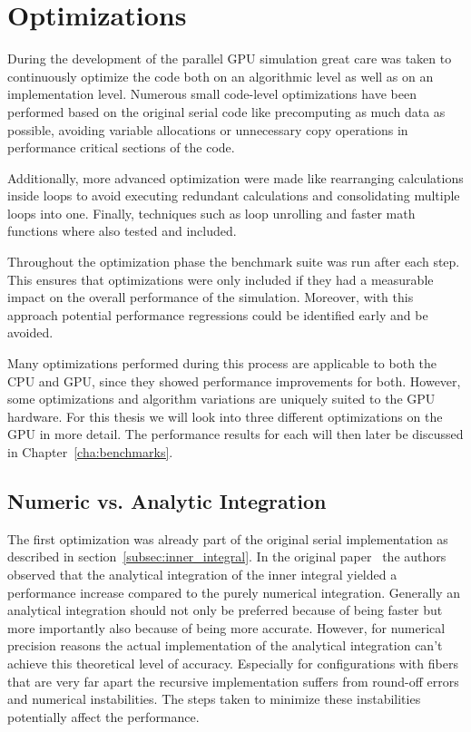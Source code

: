 \section{Optimizations}
\label{sec:parallel_optimizations}

During the development of the parallel GPU simulation great care was taken to continuously optimize the code both on an algorithmic level as well as on an implementation level. Numerous small code-level optimizations have been performed based on the original serial code like precomputing as much data as possible, avoiding variable allocations or unnecessary copy operations in performance critical sections of the code.

Additionally, more advanced optimization were made like rearranging calculations inside loops to avoid executing redundant calculations and consolidating multiple loops into one. Finally, techniques such as loop unrolling and faster math functions where also tested and included.

Throughout the optimization phase the benchmark suite was run after each step. This ensures that optimizations were only included if they had a measurable impact on the overall performance of the simulation. Moreover, with this approach potential performance regressions could be identified early and be avoided.

Many optimizations performed during this process are applicable to both the CPU and GPU, since they showed performance improvements for both. However, some optimizations and algorithm variations are uniquely suited to the GPU hardware. For this thesis we will look into three different optimizations on the GPU in more detail. The performance results for each will then later be discussed in Chapter~\ref{cha:benchmarks}.

\subsection{Numeric vs. Analytic Integration}
\label{subsec:numeric_analytic}
The first optimization was already part of the original serial implementation as described in section~\ref{subsec:inner_integral}. In the original paper~\cite{Tornberg2006} the authors observed that the analytical integration of the inner integral yielded a performance increase compared to the purely numerical integration. Generally an analytical integration should not only be preferred because of being faster but more importantly also because of being more accurate. However, for numerical precision reasons the actual implementation of the analytical integration can't achieve this theoretical level of accuracy. Especially for configurations with fibers that are very far apart the recursive implementation suffers from round-off errors and numerical instabilities. The steps taken to minimize these instabilities potentially affect the performance.

